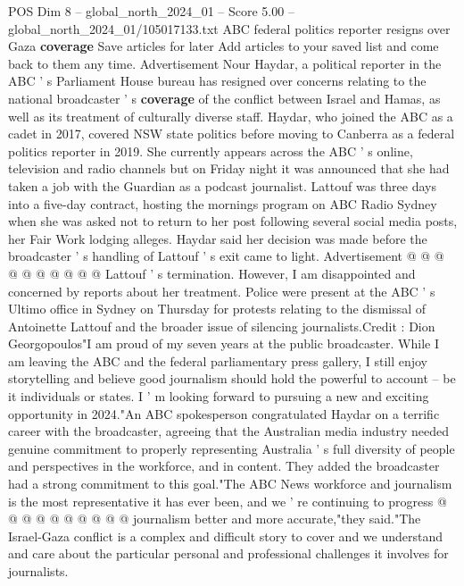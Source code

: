 \begin{textsample}{POS Dim 8 – global\_north\_2024\_01 – Score 5.00 – global\_north\_2024\_01/105017133.txt}  \label{ex:f8_pos_234}
ABC federal politics reporter resigns over Gaza \textbf{coverage} Save articles for later Add articles to your saved list and come back to them any time.
Advertisement Nour Haydar, a political reporter in the ABC ' s Parliament House bureau has resigned over concerns relating to the national broadcaster ' s \textbf{coverage} of the conflict between Israel and Hamas, as well as its treatment of culturally diverse staff.
Haydar, who joined the ABC as a cadet in 2017, covered NSW state politics before moving to Canberra as a federal politics reporter in 2019.
She currently appears across the ABC ' s online, television and radio channels but on Friday night it was announced that she had taken a job with the Guardian as a podcast journalist.
Lattouf was three days into a five-day contract, hosting the mornings program on ABC Radio Sydney when she was asked not to return to her post following several social media posts, her Fair Work lodging alleges.
Haydar said her decision was made before the broadcaster ' s handling of Lattouf ' s exit came to light.
Advertisement @ @ @ @ @ @ @ @ @ @ Lattouf ' s termination.
However, I am disappointed and concerned by reports about her treatment.
Police were present at the ABC ' s Ultimo office in Sydney on Thursday for protests relating to the dismissal of Antoinette Lattouf and the broader issue of silencing journalists.Credit : Dion Georgopoulos"I am proud of my seven years at the public broadcaster.
While I am leaving the ABC and the federal parliamentary press gallery, I still enjoy storytelling and believe good journalism should hold the powerful to account -- be it individuals or states.
I ' m looking forward to pursuing a new and exciting opportunity in 2024."An ABC spokesperson congratulated Haydar on a terrific career with the broadcaster, agreeing that the Australian media industry needed genuine commitment to properly representing Australia ' s full diversity of people and perspectives in the workforce, and in content.
They added the broadcaster had a strong commitment to this goal."The ABC News workforce and journalism is the most representative it has ever been, and we ' re continuing to progress @ @ @ @ @ @ @ @ @ @ journalism better and more accurate,"they said."The Israel-Gaza conflict is a complex and difficult story to cover and we understand and care about the particular personal and professional challenges it involves for journalists.

\end{textsample}
